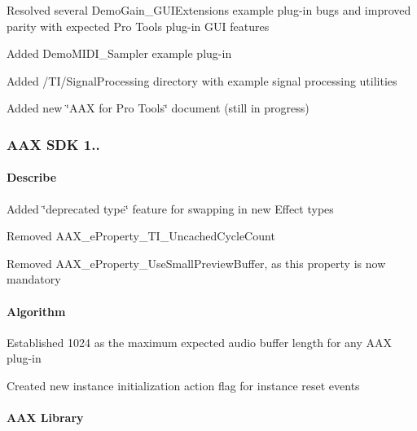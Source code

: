 \begin{DoxyItemize}
\item Resolved several Demo\+Gain\+\_\+\+G\+U\+I\+Extensions example plug-\/in bugs and improved parity with expected Pro Tools plug-\/in G\+U\+I features 
\item Added Demo\+M\+I\+D\+I\+\_\+\+Sampler example plug-\/in 
\item Added /\+T\+I/\+Signal\+Processing directory with example signal processing utilities 
\item Added new \char`\"{}\+A\+A\+X for Pro Tools\char`\"{} document (still in progress) 
\end{DoxyItemize}\hypertarget{a00375_aax_sdk_1p0p3}{}\subsubsection{A\+A\+X S\+D\+K 1..}\label{a00375_aax_sdk_1p0p3}
\hypertarget{a00375_aax_sdk_1p0p3_Describe}{}\paragraph{Describe}\label{a00375_aax_sdk_1p0p3_Describe}

\begin{DoxyItemize}
\item Added \char`\"{}deprecated type\char`\"{} feature for swapping in new Effect types 
\item Removed A\+A\+X\+\_\+e\+Property\+\_\+\+T\+I\+\_\+\+Uncached\+Cycle\+Count 
\item Removed A\+A\+X\+\_\+e\+Property\+\_\+\+Use\+Small\+Preview\+Buffer, as this property is now mandatory 
\end{DoxyItemize}\hypertarget{a00375_aax_sdk_1p0p3_Algorithm}{}\paragraph{Algorithm}\label{a00375_aax_sdk_1p0p3_Algorithm}

\begin{DoxyItemize}
\item Established 1024 as the maximum expected audio buffer length for any A\+A\+X plug-\/in 
\item Created new instance initialization action flag for instance reset events 
\end{DoxyItemize}\hypertarget{a00375_aax_sdk_1p0p3_AAXLibrary}{}\paragraph{A\+A\+X Library}\label{a00375_aax_sdk_1p0p3_AAXLibrary}

